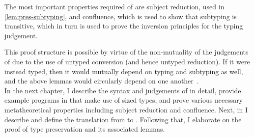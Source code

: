 The most important properties required of \lang are subject reduction,
used in \cref{lem:pres-subtyping},
and confluence, which is used to show that subtyping is transitive,
which in turn is used to prove the inversion principles for the typing judgement.

This proof structure is possible by virtue of the non-mutuality of the judgements of \lang
due to the use of untyped conversion (and hence untyped reduction).
If it were instead typed, then it would mutually depend on typing and subtyping as well,
and the above lemmas would circularly depend on one another~\citep{wjb}. \\

\noindent In the next chapter, I describe the syntax and judgements of \lang in detail,
provide example programs in \lang that make use of sized types,
and prove various necessary metatheoretical properties including subject reduction and confluence.
Next, in \TODO I describe \CICE and define the translation from \lang to \CICE.
Following that, I elaborate on the proof of type preservation and its associated lemmas.
